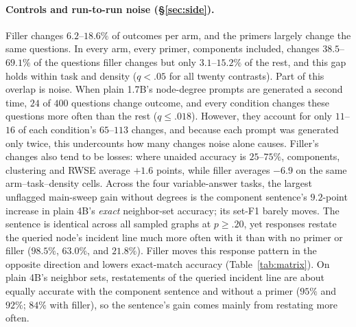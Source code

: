 \documentclass[11pt]{article}
\begin{document}
\paragraph{Controls and run-to-run noise (\S\ref{sec:side}).} Filler changes $6.2$--$18.6\%$ of outcomes per arm, and the primers largely change the same questions. %
In every arm, every primer, components included, changes $38.5$--$69.1\%$ of the questions filler changes but only $3.1$--$15.2\%$ of the rest, and this gap holds within task and density ($q<.05$ for all twenty contrasts). %
Part of this overlap is noise. When plain 1.7B's node-degree prompts are generated a second time, $24$ of $400$ questions change outcome, and every condition changes these questions more often than the rest ($q\leq.018$). However, they account for only $11$--$16$ of each condition's $65$--$113$ changes, and because each prompt was generated only twice, this undercounts how many changes noise alone causes. %
Filler's changes also tend to be losses: where unaided accuracy is $25$--$75\%$, components, clustering and RWSE average $+1.6$ points, while filler averages $-6.9$ on the same arm--task--density cells. %
Across the four variable-answer tasks, the largest unflagged main-sweep gain without degrees is the component sentence's $9.2$-point increase in plain 4B's \emph{exact} neighbor-set accuracy; its set-F1 barely moves. The sentence is identical across all sampled graphs at $p\geq.20$, yet responses restate the queried node's incident line much more often with it than with no primer or filler ($98.5\%$, $63.0\%$, and $21.8\%$). Filler moves this response pattern in the opposite direction and lowers exact-match accuracy (Table~\ref{tab:matrix}). %
On plain 4B's neighbor sets, restatements of the queried incident line are about equally accurate with the component sentence and without a primer ($95\%$ and $92\%$; $84\%$ with filler), so the sentence's gain comes mainly from restating more often. %
\end{document}
